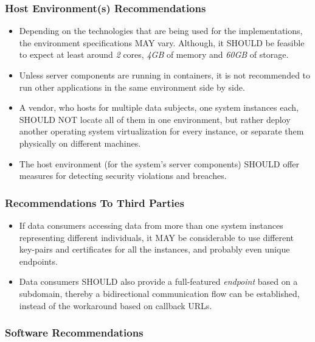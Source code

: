 \documentclass[12pt,english,a4paper,titlepage,cleardoublepage=empty,dottedtoc]{report}
\begin{document}
\subsubsection*{Host Environment(s)
Recommendations}\label{host-environments-recommendations}

\begin{itemize}
\item
  Depending on the technologies that are being used for the
  implementations, the environment specifications MAY vary. Although, it
  SHOULD be feasible to expect at least around \emph{2} cores,
  \emph{4GB} of memory and \emph{60GB} of storage.
\item
  Unless server components are running in containers, it is not
  recommended to run other applications in the same environment side by
  side.
\item
  A vendor, who hosts for multiple data subjects, one system instances
  each, SHOULD NOT locate all of them in one environment, but rather
  deploy another operating system virtualization for every instance, or
  separate them physically on different machines.
\item
  The host environment (for the system's server components) SHOULD offer
  measures for detecting security violations and breaches.
\end{itemize}

\subsubsection*{Recommendations To Third
Parties}\label{recommendations-to-third-parties}

\begin{itemize}
\item
  If data consumers accessing data from more than one system instances
  representing different individuals, it MAY be considerable to use
  different key-pairs and certificates for all the instances, and
  probably even unique endpoints.
\item
  Data consumers SHOULD also provide a full-featured \emph{endpoint}
  based on a subdomain, thereby a bidirectional communication flow can
  be established, instead of the workaround based on callback URLs.
\end{itemize}

\subsubsection*{Software
Recommendations}\label{software-recommendations}
\end{document}
